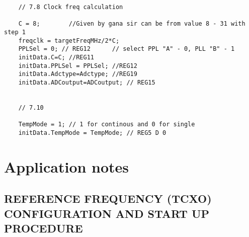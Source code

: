 \documentclass[12pt,a4paper,onecolumn]{article}
\begin{document}
\begin{verbatim}
	// 7.8 Clock freq calculation 

	C = 8;        //Given by gana sir can be from value 8 - 31 with step 1
	freqclk = targetFreqMHz/2*C; 
	PPLSel = 0; // REG12      // select PPL "A" - 0, PLL "B" - 1
	initData.C=C; //REG11
	initData.PPLSel = PPLSel; //REG12
	initData.Adctype=Adctype; //REG19
	initData.ADCoutput=ADCoutput; // REG15


	// 7.10 

	TempMode = 1; // 1 for continous and 0 for single 
	initData.TempMode = TempMode; // REG5 D 0 

\end{verbatim}

\section{Application notes }
\subsection{REFERENCE FREQUENCY (TCXO) CONFIGURATION AND START UP PROCEDURE}
\end{document}
